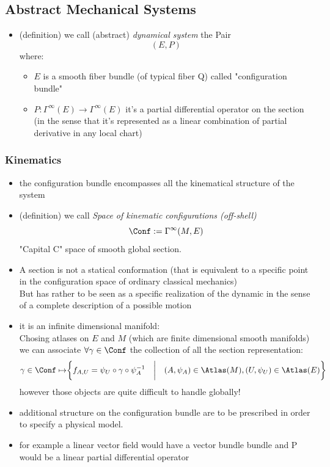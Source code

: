 \documentclass[a4paper,11pt]{scrartcl}
\begin{document}
    \subsection{Abstract Mechanical Systems}
    \begin{itemize}
        \item (definition) we call (abstract) \emph{dynamical system} the Pair $$(E,P)$$ where:
        \begin{itemize}
            \item $E$ is a smooth fiber bundle (of typical fiber Q) called "configuration bundle"
            \item $P: \Gamma^\infty(E) \rightarrow \Gamma^\infty(E)$ it's a partial differential operator on the section\\
            (in the sense that it's represented as a linear combination of partial derivative in any local chart)
        \end{itemize}
    \end{itemize}
    \subsubsection*{Kinematics}
    \begin{itemize}
        \item the configuration bundle encompasses all the kinematical structure of the system
        \item (definition) we call \emph{Space of kinematic configurations (off-shell)}
        $$ \Conf := \Gamma^\infty(M,E)$$
        "Capital C"  space of smooth global section.
        \item A section is not a statical conformation (that is equivalent to a specific point in the configuration space of ordinary classical mechanics) \\
        But has rather to be seen as a specific realization of the dynamic in the sense of a complete description of a possible motion
        \item it is an infinite dimensional manifold:\\
        Chosing atlases on $E$ and $M$ (which are finite dimensional smooth manifolds) we can associate $\forall \gamma \in \Conf$ the collection of all the section representation:
        $$ \gamma \in \Conf \mapsto \biggr\{f_{A,U}=\psi_U \circ \gamma \circ \psi_A^{-1} \quad \biggr\vert \quad (A,\psi_A) \in \Atlas(M), (U,\psi_U)\in \Atlas(E)   \biggr\} $$
        however those objects are quite difficult to handle globally!
        \item additional structure on the configuration bundle are to be prescribed in order to specify a physical model.
        \item for example a linear vector field would have a vector bundle bundle and P would be a linear partial differential operator
    \end{itemize}
\end{document}
